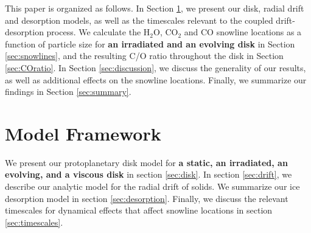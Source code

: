 \documentclass[apj]{emulateapj}
\newcommand{\emgr}[1]{\emph{ \color{gray} #1}}
\begin{document}



This paper is organized as follows. In Section \ref{sec:model}, we present our disk, radial drift and desorption models, as well as the timescales relevant to the coupled drift-desorption process. We calculate the H$_2$O, CO$_2$ and CO snowline locations as a function of particle size for \textbf{an irradiated and an evolving disk} in Section \ref{sec:snowlines}, and the resulting C/O ratio throughout the disk in Section \ref{sec:COratio}. In Section \ref{sec:discussion}, we discuss the generality of our results, as well as additional effects on the snowline locations. Finally, we summarize our findings in Section \ref{sec:summary}.

\section{Model Framework} 
\label{sec:model}

We present our protoplanetary disk model for \textbf{a static, an irradiated, an evolving, and a viscous disk} in section \ref{sec:disk}. In section \ref{sec:drift}, we describe our analytic model for the radial drift of solids. We summarize our ice desorption model in section \ref{sec:desorption}. Finally, we discuss the relevant timescales for dynamical effects that affect snowline locations %
in section \ref{sec:timescales}.
\end{document}
